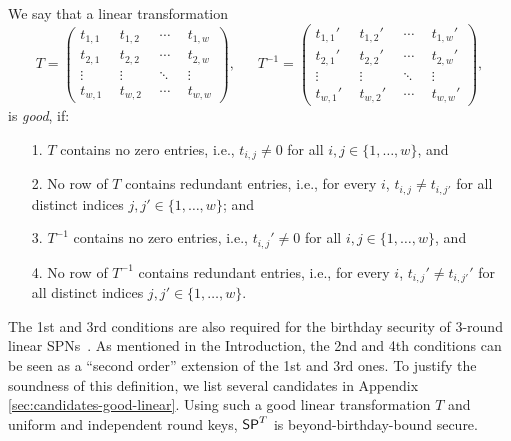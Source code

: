 \documentclass[journal=tosc,final,nohyperref]{iacrtrans}
\begin{document}
\begin{definition}
	\label{defn:good-T}
	
	We say that a linear transformation
	\[
	T=
	\left(
	\begin{array}{cccc}
	t_{1,1}~ & ~t_{1,2}~ & ~\cdots~ & ~t_{1,w}  \\
	t_{2,1}~ & ~t_{2,2}~ & ~\cdots~ & ~t_{2,w}  \\
	\vdots~   & ~\vdots~  &~\ddots~ & ~\vdots   \\
	t_{w,1}~ & ~t_{w,2}~ & ~\cdots~ & ~t_{w,w}  
	\end{array}
	\right),\ \ \ \ \ \ \ 
	T^{-1}=
	\left(
	\begin{array}{cccc}
	t_{1,1}'~ & ~t_{1,2}'~ & ~\cdots~ & ~t_{1,w}'  \\
	t_{2,1}'~ & ~t_{2,2}'~ & ~\cdots~ & ~t_{2,w}'  \\
	\vdots~   & ~\vdots~  &~\ddots~ & ~\vdots   \\
	t_{w,1}'~ & ~t_{w,2}'~ & ~\cdots~ & ~t_{w,w}'  
	\end{array}
	\right),
	\]
	is {\it good}, if:
	\begin{enumerate}
		\item[1.] $T$ contains no zero entries, i.e., $t_{i,j}\neq 0$ for all $i,j\in\{1,\ldots,w\}$, and
		\item[2.] No row of $T$ contains redundant entries, i.e., for every $i$, $t_{i,j}\neq t_{i,j'}$ for all distinct indices $j,j'\in\{1,\ldots,w\}$; and
		\item[3.] $T^{-1}$ contains no zero entries, i.e., $t_{i,j}'\neq 0$ for all $i,j\in\{1,\ldots,w\}$, and
		\item[4.] No row of $T^{-1}$ contains redundant entries, i.e., for every $i$, $t_{i,j}'\neq t_{i,j'}'$ for all distinct indices $j,j'\in\{1,\ldots,w\}$.
	\end{enumerate}
\end{definition}
%
The 1st and 3rd conditions are also required for the birthday security of 3-round linear SPNs~\cite[Sect. 3]{EPRINT:DKSTZ17}. As mentioned in the Introduction, the 2nd and 4th conditions can be seen as a ``second order'' extension of the 1st and 3rd ones. To justify the soundness of this definition, we list several candidates in Appendix \ref{sec:candidates-good-linear}. Using such a good linear transformation $T$ and uniform and independent round keys, $\mathsf{SP}^T$ is beyond-birthday-bound secure.

\end{document}
